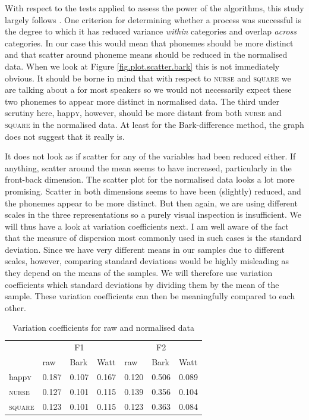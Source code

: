 With respect to the tests applied to assess the power of the  algorithms, this study largely follows \textcite{langstrofdiss}.
One criterion for determining whether a  process was successful is the degree to which it has reduced variance \emph{within} categories and overlap \emph{across} categories.
In our case this would mean that phonemes should be more distinct and that scatter around phoneme means should be reduced in the normalised data.
When we look at Figure \ref{fig.plot.scatter.bark} this is not immediately obvious.
It should be borne in mind that with respect to \textsc{nurse} and \textsc{square} we are talking about a  for most speakers so we would not necessarily expect these two phonemes to appear more distinct in normalised data.
The third  under scrutiny here, happ\textsc{y}, however, should be more distant from both \textsc{nurse} and \textsc{square} in the normalised data.
At least for the Bark-difference method, the graph does not suggest that it really is.

It does not look as if scatter for any of the variables had been reduced either.
If anything, scatter around the mean seems to have increased, particularly in the front-back dimension.
The scatter plot for the \citeauthor{wattfabricius2002} normalised data looks a lot more promising.
Scatter in both dimensions seems to have been (slightly) reduced, and the phonemes appear to be more distinct.
But then again, we are using different scales in the three representations so a purely visual inspection is insufficient.
We will thus have a look at variation coefficients next. I am well aware of the fact that the measure of dispersion most commonly used in such cases is the standard deviation. Since we have very different means in our samples due to different scales, however, comparing standard deviations would be highly misleading as they depend on the means of the samples. We will therefore use variation coefficients which  standard deviations by dividing them by the mean of the sample. These variation coefficients can then be meaningfully compared to each other.

\begin{table}[h]
	\centering
	\caption{Variation coefficients for raw and normalised data}
	\begin{tabular}{lllllll}
		\hline
		& \multicolumn{3}{c}{F1} & \multicolumn{3}{c}{F2}\\
		\isi{vowel} & raw & Bark & Watt & raw & Bark & Watt\\
		\hline
		happ\textsc{y} &
		0.187 & 0.107 & 0.167 &
		0.120 & 0.506 & 0.089\\
		\textsc{nurse} &
		0.127 & 0.101 & 0.115 &
		0.139 & 0.356 & 0.104\\
		\textsc{square} &
		0.123 & 0.101 & 0.115 &
		0.123 & 0.363 & 0.084\\
		\hline
	\end{tabular}
	\label{tab.varcoeff}
\end{table}


